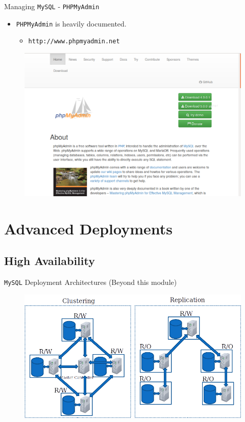 \documentclass[xcolor=table,aspectratio=169]{beamer}
\begin{document}
\begin{frame}{Managing \texttt{MySQL} - \texttt{PHPMyAdmin}}
  \begin{itemize}
    \item \texttt{PHPMyAdmin} is heavily documented.
    \begin{itemize}
      \item \texttt{http://www.phpmyadmin.net}
    \end{itemize}
  \end{itemize}
  \begin{figure}
    \begin{center}
      \includegraphics[width=0.5\linewidth]{PHPMyAdminSite.png}
    \end{center}
  \end{figure}
\end{frame}

\section{Advanced Deployments}
\subsection{High Availability}
\begin{frame}{\texttt{MySQL} Deployment Architectures \small{(Beyond this module)}}
  \begin{figure}
    \begin{center}
      \includegraphics[width=0.8\linewidth]{Advanced.png}
    \end{center}
  \end{figure}
\end{frame}
\end{document}
